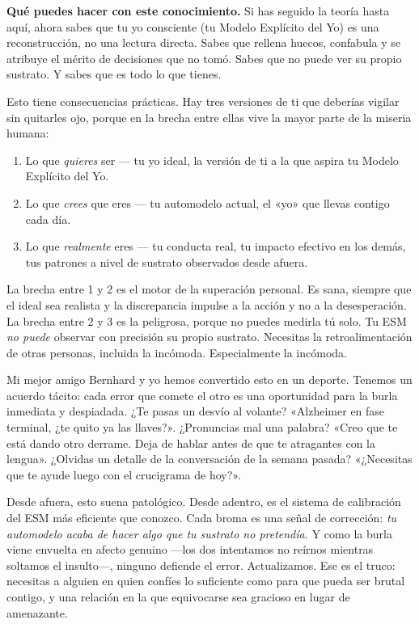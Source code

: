 \documentclass[11pt, twoside, openright]{book}
\begin{document}
\textbf{Qué puedes hacer con este conocimiento.} Si has seguido la teoría hasta aquí, ahora sabes que tu yo consciente (tu Modelo Explícito del Yo) es una reconstrucción, no una lectura directa. Sabes que rellena huecos, confabula y se atribuye el mérito de decisiones que no tomó. Sabes que no puede ver su propio sustrato. Y sabes que es todo lo que tienes.

Esto tiene consecuencias prácticas. Hay tres versiones de ti que deberías vigilar sin quitarles ojo, porque en la brecha entre ellas vive la mayor parte de la miseria humana:

\begin{enumerate}
  \item Lo que \textit{quieres} ser --- tu yo ideal, la versión de ti a la que aspira tu Modelo Explícito del Yo.
  \item Lo que \textit{crees} que eres --- tu automodelo actual, el «yo» que llevas contigo cada día.
  \item Lo que \textit{realmente} eres --- tu conducta real, tu impacto efectivo en los demás, tus patrones a nivel de sustrato observados desde afuera.
\end{enumerate}

La brecha entre 1 y 2 es el motor de la superación personal. Es sana, siempre que el ideal sea realista y la discrepancia impulse a la acción y no a la desesperación. La brecha entre 2 y 3 es la peligrosa, porque no puedes medirla tú solo. Tu ESM \textit{no puede} observar con precisión su propio sustrato. Necesitas la retroalimentación de otras personas, incluida la incómoda. Especialmente la incómoda.

Mi mejor amigo Bernhard y yo hemos convertido esto en un deporte. Tenemos un acuerdo tácito: cada error que comete el otro es una oportunidad para la burla inmediata y despiadada. ¿Te pasas un desvío al volante? «Alzheimer en fase terminal, ¿te quito ya las llaves?». ¿Pronuncias mal una palabra? «Creo que te está dando otro derrame. Deja de hablar antes de que te atragantes con la lengua». ¿Olvidas un detalle de la conversación de la semana pasada? «¿Necesitas que te ayude luego con el crucigrama de hoy?».

Desde afuera, esto suena patológico. Desde adentro, es el sistema de calibración del ESM más eficiente que conozco. Cada broma es una señal de corrección: \textit{tu automodelo acaba de hacer algo que tu sustrato no pretendía.} Y como la burla viene envuelta en afecto genuino ---los dos intentamos no reírnos mientras soltamos el insulto---, ninguno defiende el error. Actualizamos. Ese es el truco: necesitas a alguien en quien confíes lo suficiente como para que pueda ser brutal contigo, y una relación en la que equivocarse sea gracioso en lugar de amenazante.
\end{document}

